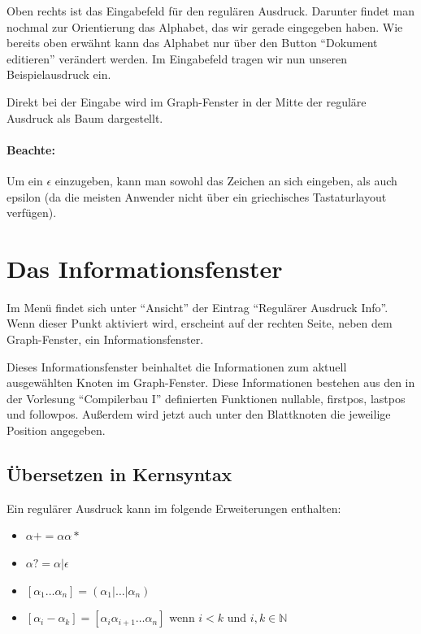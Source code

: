 Oben rechts ist das Eingabefeld für den regulären Ausdruck. Darunter findet man nochmal zur Orientierung das Alphabet, das wir gerade eingegeben haben. Wie bereits oben erwähnt kann das Alphabet nur über den Button "`Dokument editieren"' verändert werden. Im Eingabefeld tragen wir nun unseren Beispielausdruck  ein.

Direkt bei der Eingabe wird im Graph-Fenster in der Mitte der reguläre Ausdruck als Baum dargestellt.

\paragraph*{Beachte:} Um ein $\epsilon$ einzugeben, kann man sowohl das Zeichen an sich eingeben, als auch epsilon (da die meisten Anwender nicht über ein griechisches Tastaturlayout verfügen).

\section{Das Informationsfenster}

Im Menü findet sich unter "`Ansicht"' der Eintrag "`Regulärer Ausdruck Info"'. Wenn dieser Punkt aktiviert wird, erscheint auf der rechten Seite, neben dem Graph-Fenster, ein Informationsfenster.

Dieses Informationsfenster beinhaltet die Informationen zum aktuell ausgewählten Knoten im Graph-Fenster. Diese Informationen bestehen aus den in der Vorlesung "`Compilerbau I"' definierten Funktionen nullable, firstpos, lastpos und followpos. Außerdem wird jetzt auch unter den Blattknoten die jeweilige Position angegeben.

\subsection{Übersetzen in Kernsyntax}

Ein regulärer Ausdruck kann im \gtitool folgende Erweiterungen enthalten:

\begin{itemize}
  \item $\alpha+ = \alpha \alpha*$
  \item $\alpha? = \alpha|\epsilon$
  \item $[\alpha _1\ldots\alpha _n] = (\alpha _1|\ldots|\alpha _n)$
  \item $[\alpha _i - \alpha _k] = [\alpha _i \alpha _{i+1}\ldots\alpha _n]$ wenn $i < k$ und $i,k\in{\mathbb N}$
\end{itemize}


